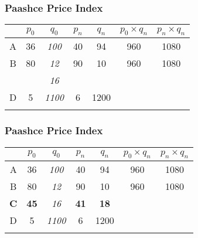 \documentclass{beamer}
\begin{document}
\begin{frame}
\frametitle{Paashce Price Index}
\begin{center}
\LARGE
\begin{tabular}{|c||c|c||c|c||c|c|}
\hline  &\phantom{s}$p_0$\phantom{s}	&	$q_0$	&	$p_n$	&	$q_n$	&	$p_0 \times q_n$	&	$p_n \times q_n$	\\	\hline \hline
A & 36	&	\textit{100}	&	40	&	94	&	960	&	1080	\\	\hline

B & 80	&	\textit{12}	&	90	&	10	&	960	&	1080	\\	\hline
\textbf{{\color{red}{C}}} & \textbf{{\color{red}{45}}}	&	\textit{16}	&	\textbf{{\color{red}{41}}}	&	\textbf{{\color{red}{18}}}	&	\phantom{3600}	&	\phantom{4000}	\\	\hline
D & 5	&	\textit{1100}	&	6	&	1200	&	\phantom{5500}	&	\phantom{6600}	\\	\hline \hline
& 	&		&		&		&	\phantom{10780}	&	\phantom{12336}	\\	\hline
\end{tabular} 
\end{center}
\end{frame}
\begin{frame}
\frametitle{Paashce Price Index}
\begin{center}
\LARGE
\begin{tabular}{|c||c|c||c|c||c|c|}
\hline  &\phantom{s}$p_0$\phantom{s}	&	$q_0$	&	$p_n$	&	$q_n$	&	$p_0 \times q_n$	&	$p_n \times q_n$	\\	\hline \hline
A & 36	&	\textit{100}	&	40	&	94	&	960	&	1080	\\	\hline
B & 80	&	\textit{12}	&	90	&	10	&	960	&	1080	\\	\hline
\textbf{C} & \textbf{45}	&	\textit{16}	&	\textbf{41}	&	\textbf{18}	&	\textbf{{\color{red}{3600}}}	&	\textbf{{\color{red}{4000}}}	\\	\hline
D & 5	&	\textit{1100}	&	6	&	1200	&	\phantom{5500}	&	\phantom{6600}	\\	\hline \hline
& 	&		&		&		&	\phantom{10780}	&	\phantom{12336}	\\	\hline
\end{tabular} 
\end{center}
\end{frame}


\end{document}

